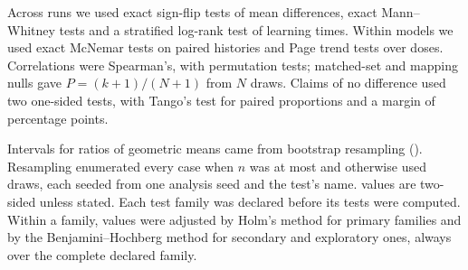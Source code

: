 Across runs we used exact sign-flip tests of mean differences, exact Mann--Whitney tests and a stratified log-rank test of
learning times. Within models we used exact McNemar tests on paired histories and Page trend tests over doses. Correlations were Spearman's, with permutation tests;
matched-set and mapping nulls gave $P = (k + 1)/(N + 1)$ from $N$ draws. Claims of no difference used two one-sided tests,
with Tango's test for paired proportions and a margin of  percentage points.

Intervals for ratios of geometric means came from bootstrap resampling (). Resampling enumerated every case when $n$
was at most  and otherwise used  draws, each seeded from one analysis seed and the test's name. \Pv{}
values are two-sided unless stated. Each test family was declared before its tests were computed. Within a family, \Pv{} values
were adjusted by Holm's method for primary families and by the Benjamini--Hochberg method for secondary and exploratory ones, always
over the complete declared family.

